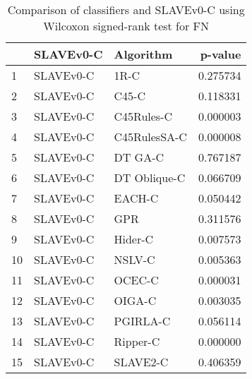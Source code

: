 \begin{table}
\footnotesize
\caption{Comparison of classifiers and SLAVEv0-C using Wilcoxon signed-rank test for FN}
\label{tab:SLAVEv0-C wilcoxon FN comparison}
\begin{tabular}{lllr}
\hline
 & SLAVEv0-C & Algorithm & p-value \\
\hline
1 & SLAVEv0-C & 1R-C & 0.275734 \\
2 & SLAVEv0-C & C45-C & 0.118331 \\
3 & SLAVEv0-C & C45Rules-C & 0.000003 \\
4 & SLAVEv0-C & C45RulesSA-C & 0.000008 \\
5 & SLAVEv0-C & DT GA-C & 0.767187 \\
6 & SLAVEv0-C & DT Oblique-C & 0.066709 \\
7 & SLAVEv0-C & EACH-C & 0.050442 \\
8 & SLAVEv0-C & GPR & 0.311576 \\
9 & SLAVEv0-C & Hider-C & 0.007573 \\
10 & SLAVEv0-C & NSLV-C & 0.005363 \\
11 & SLAVEv0-C & OCEC-C & 0.000031 \\
12 & SLAVEv0-C & OIGA-C & 0.003035 \\
13 & SLAVEv0-C & PGIRLA-C & 0.056114 \\
14 & SLAVEv0-C & Ripper-C & 0.000000 \\
15 & SLAVEv0-C & SLAVE2-C & 0.406359 \\
\hline
\end{tabular}
\end{table}
